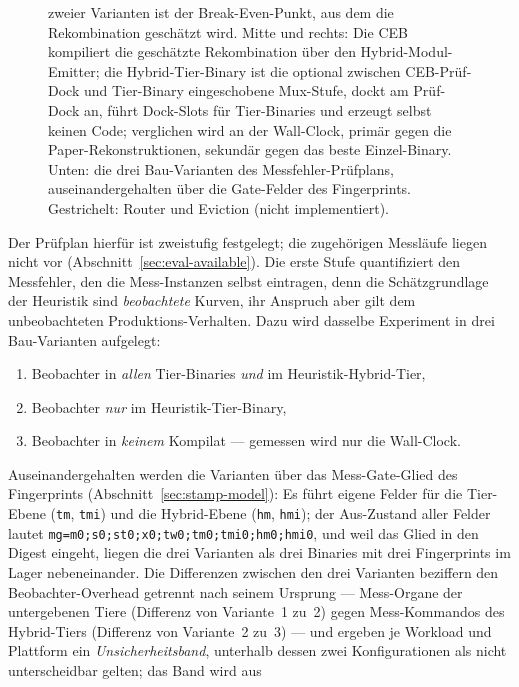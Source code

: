 \begin{nurkurz}
\begin{figure}[htbp]
{zweier Varianten ist der Break-Even-Punkt, aus dem die Rekombination geschätzt wird. Mitte und rechts:
Die CEB kompiliert die geschätzte Rekombination über den Hybrid-Modul-Emitter; die Hybrid-Tier-Binary
ist die optional zwischen CEB-Prüf-Dock und Tier-Binary eingeschobene Mux-Stufe, dockt am Prüf-Dock an,
führt Dock-Slots für Tier-Binaries und erzeugt selbst keinen Code; verglichen
wird an der Wall-Clock, primär gegen die Paper-Rekonstruktionen, sekundär gegen das beste
Einzel-Binary. Unten: die drei Bau-Varianten des Messfehler-Prüfplans, auseinandergehalten über die
Gate-Felder des Fingerprints. Gestrichelt: Router und Eviction (nicht
implementiert).}\label{fig:eval-messkurven}
\end{figure}
\end{nurkurz}

\begin{nurlang}
Der Prüfplan hierfür ist zweistufig festgelegt; die zugehörigen Messläufe liegen nicht vor
(Abschnitt~\ref{sec:eval-available}). Die erste Stufe quantifiziert den
Messfehler, den die Mess-Instanzen selbst eintragen, denn die Schätzgrundlage der Heuristik sind
\emph{beobachtete} Kurven, ihr Anspruch aber gilt dem unbeobachteten Produktions-Verhalten. Dazu wird
dasselbe Experiment in drei Bau-Varianten aufgelegt:
\begin{enumerate}
  \item Beobachter in \emph{allen} Tier-Binaries \emph{und} im Heuristik-Hybrid-Tier,
  \item Beobachter \emph{nur} im Heuristik-Tier-Binary,
  \item Beobachter in \emph{keinem} Kompilat --- gemessen wird nur die Wall-Clock.
\end{enumerate}
Auseinandergehalten werden die Varianten über das Mess-Gate-Glied des Fingerprints
(Abschnitt~\ref{sec:stamp-model}): Es führt eigene Felder für die Tier-Ebene (\texttt{tm},
\texttt{tmi}) und die Hybrid-Ebene (\texttt{hm}, \texttt{hmi}); der Aus-Zustand aller Felder lautet
\texttt{mg=m0;s0;st0;x0;tw0;tm0;tmi0;hm0;hmi0}, und weil das Glied in den Digest eingeht, liegen die
drei Varianten als drei Binaries mit drei Fingerprints im Lager nebeneinander. Die Differenzen zwischen
den drei Varianten beziffern den Beobachter-Overhead getrennt nach seinem Ursprung --- Mess-Organe der
untergebenen Tiere (Differenz von Variante~1 zu~2) gegen Mess-Kommandos des Hybrid-Tiers (Differenz
von Variante~2 zu~3) --- und ergeben je Workload und Plattform ein \emph{Unsicherheitsband},
unterhalb dessen zwei Konfigurationen als nicht unterscheidbar gelten; das Band wird aus

\end{nurlang}
